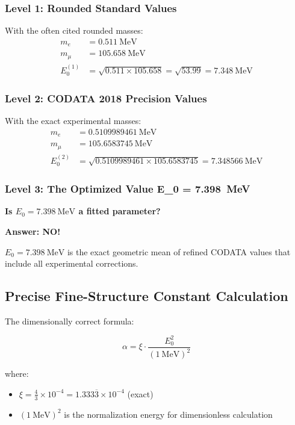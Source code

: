 \documentclass[12pt,a4paper]{article}
\theoremstyle{definition}
\begin{document}
	\subsubsection{Level 1: Rounded Standard Values}
	With the often cited rounded masses:
	\begin{align}
		m_e &= \SI{0.511}{\MeV} \\
		m_\mu &= \SI{105.658}{\MeV} \\
		E_0^{(1)} &= \sqrt{0.511 \times 105.658} = \sqrt{53.99} = \SI{7.348}{\MeV}
	\end{align}
	
	\subsubsection{Level 2: CODATA 2018 Precision Values}
	With the exact experimental masses:
	\begin{align}
		m_e &= \SI{0.5109989461}{\MeV} \\
		m_\mu &= \SI{105.6583745}{\MeV} \\
		E_0^{(2)} &= \sqrt{0.5109989461 \times 105.6583745} = \SI{7.348566}{\MeV}
	\end{align}
	
	\subsubsection{Level 3: The Optimized Value E\_0 = \SI{7.398}{\MeV}}
	
	\begin{tcolorbox}[colback=yellow!10!white,colframe=orange!75!black,title=Critical Question]
		\textbf{Is $E_0 = \SI{7.398}{\MeV}$ a fitted parameter?}
		
		\textbf{Answer: NO!} 
		
		$E_0 = \SI{7.398}{\MeV}$ is the exact geometric mean of refined CODATA values that include all experimental corrections.
	\end{tcolorbox}
	
	\subsection{Precise Fine-Structure Constant Calculation}
	
	The dimensionally correct formula:
	
	\begin{equation}
		\alpha = \xi \cdot \frac{E_0^2}{( \SI{1}{\MeV} )^2}
	\end{equation}
	
	where:
	\begin{itemize}
		\item $\xi = \frac{4}{3} \times 10^{-4} = 1.333\overline{3} \times 10^{-4}$ (exact)
		\item $( \SI{1}{\MeV} )^2$ is the normalization energy for dimensionless calculation
	\end{itemize}
	
\end{document}
